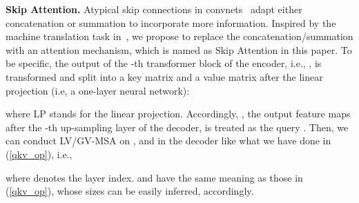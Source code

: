 \documentclass[journal,twoside,web]{ieeecolor}
\begin{document}
\noindent \textbf{Skip Attention.} Atypical skip connections in convnets~\cite{ronneberger2015u,he2016deep} adapt either concatenation or summation to incorporate more information. Inspired by the machine translation task in~\cite{vaswani2017attention}, we propose to replace the concatenation/summation with an attention mechanism, which is named as Skip Attention in this paper. To be specific, the output of the -th transformer block of the encoder, i.e., , is transformed and split into a key matrix  and a value matrix  after the linear projection (i.e, a one-layer neural network):

where LP stands for the linear projection. Accordingly, , the output feature maps after the -th up-sampling layer of the decoder, is treated as the query . Then, we can conduct LV/GV-MSA on ,  and  in the decoder like what we have done in (\ref{qkv_op}), i.e.,

where  denotes the layer index.  and  have the same meaning as those in (\ref{qkv_op}), whose sizes can be easily inferred, accordingly.
\end{document}
